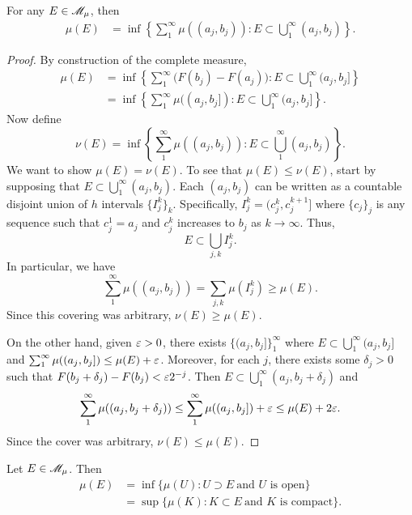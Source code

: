 \documentclass[12pt]{article} %
\begin{document}
\begin{lemma}\label{lem:lebesgue-stieltjes-alt-definition}
    For any $E \in \mathscr{M}_\mu$, then \begin{align*}
        \mu(E) &= \inf \left\{ \sum_1^\infty \mu((a_j, b_j)) : E \subset \bigcup_1^\infty (a_j, b_j) \right\}.
    \end{align*}
\end{lemma}

\begin{proof}
    By construction of the complete measure, \begin{align*}
        \mu(E) &= \inf \left\{ \sum_1^\infty \Big(F(b_j) - F(a_j) \Big) : E \subset \bigcup_1^\infty (a_j, b_j] \right\}\\
        &= \inf \left\{ \sum_1^\infty \mu((a_j, b_j]) : E \subset \bigcup_1^\infty (a_j, b_j] \right\}.
    \end{align*}
    Now define \[\nu(E) = \inf \left\{ \sum_1^\infty \mu((a_j, b_j)) : E \subset \bigcup_1^\infty (a_j, b_j) \right\}.\] We want to show $\mu(E) = \nu(E)$. To see that $\mu(E) \leq \nu(E)$, start by supposing that $E \subset \bigcup_1^{\infty} (a_j, b_j)$. Each $(a_j, b_j)$ can be written as a countable disjoint union of $h$ intervals $\{I_j^k\}_k$. Specifically, $I_j^k = (c_j^k, c_j^{k+1}]$ where $\{c_j\}_j$ is any sequence such that $c_j^1 = a_j$ and $c_j^k$ increases to $b_j$ as $k \to \infty$. Thus, \[E \subset \bigcup_{j, k} I_j^k.\] In particular, we have \[\sum_1^{\infty} \mu((a_j, b_j)) = \sum_{j, k} \mu(I_j^k) \geq \mu(E).\] Since this covering was arbitrary, $\nu(E) \geq \mu(E)$.

    On the other hand, given $\varepsilon > 0$, there exists $\{(a_j, b_j]\}_1^{\infty}$ where $E \subset \bigcup_1^{\infty} (a_j, b_j]$ and $\sum_1^{\infty} \mu((a_j, b_j]) \leq \mu(E) + \varepsilon$. Moreover, for each $j$, there exists some $\delta_j > 0$ such that $F(b_j + \delta_j) - F(b_j) < \varepsilon 2^{-j}$. Then $E \subset \bigcup_1^{\infty} (a_j, b_j + \delta_j)$ and \[\sum_1^\infty \mu((a_j, b_j + \delta_j)) \leq \sum_1^\infty \mu((a_j, b_j]) + \varepsilon \leq \mu(E) + 2\varepsilon.\] Since the cover was arbitrary, $\nu(E) \leq \mu(E)$.
\end{proof}

\begin{theorem}
    Let $E \in \mathscr{M}_\mu$. Then \begin{align*}
        \mu(E) &= \inf\{\mu(U) : U \supset E \ \text{and $U$ is open}\}\\
        &= \sup\{\mu(K) : K \subset E \ \text{and $K$ is compact}\}.
    \end{align*}
\end{theorem}
\end{document}
